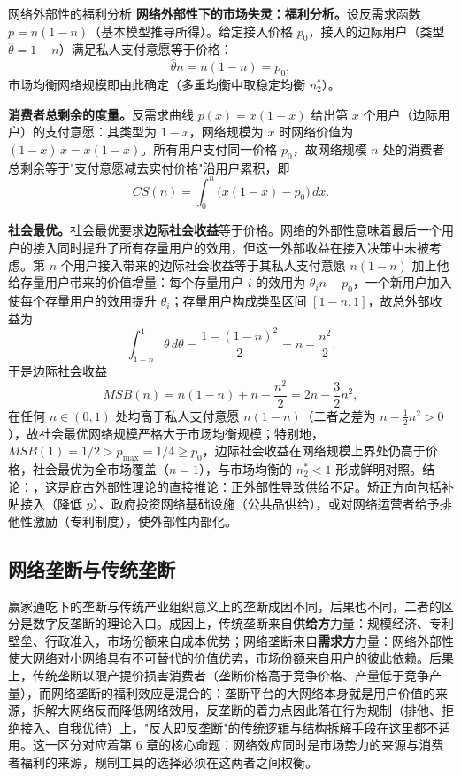 \begin{derivation}{网络外部性的福利分析}{}
\textbf{网络外部性下的市场失灵：福利分析。}设反需求函数 $p = n(1-n)$（基本模型推导所得）。给定接入价格 $p_0$，接入的边际用户（类型 $\hat\theta = 1-n$）满足私人支付意愿等于价格：
\[
\hat\theta n = n(1-n) = p_0,
\]
市场均衡网络规模即由此确定（多重均衡中取稳定均衡 $n_2^*$）。

\textbf{消费者总剩余的度量。}反需求曲线 $p(x) = x(1-x)$ 给出第 $x$ 个用户（边际用户）的支付意愿：其类型为 $1-x$，网络规模为 $x$ 时网络价值为 $(1-x)\,x = x(1-x)$。所有用户支付同一价格 $p_0$，故网络规模 $n$ 处的消费者总剩余等于"支付意愿减去实付价格"沿用户累积，即
\[
CS(n) = \int_0^n \bigl(x(1-x) - p_0\bigr) \, dx.
\]

\textbf{社会最优。}社会最优要求\textbf{边际社会收益}等于价格。网络的外部性意味着最后一个用户的接入同时提升了所有存量用户的效用，但这一外部收益在接入决策中未被考虑。第 $n$ 个用户接入带来的边际社会收益等于其私人支付意愿 $n(1-n)$ 加上他给存量用户带来的价值增量：每个存量用户 $i$ 的效用为 $\theta_i n - p_0$，一个新用户加入使每个存量用户的效用提升 $\theta_i$；存量用户构成类型区间 $[1-n, 1]$，故总外部收益为
\[
\int_{1-n}^{1} \theta \, d\theta = \frac{1 - (1-n)^2}{2} = n - \frac{n^2}{2}.
\]
于是边际社会收益
\[
MSB(n) = n(1-n) + n - \frac{n^2}{2} = 2n - \frac{3}{2} n^2,
\]
在任何 $n \in (0,1)$ 处均高于私人支付意愿 $n(1-n)$（二者之差为 $n - \tfrac12 n^2 > 0$），故社会最优网络规模严格大于市场均衡规模；特别地，$MSB(1) = 1/2 > p_{\max} = 1/4 \geq p_0$，边际社会收益在网络规模上界处仍高于价格，社会最优为全市场覆盖（$n = 1$），与市场均衡的 $n_2^* < 1$ 形成鲜明对照。结论：，这是庇古外部性理论的直接推论：正外部性导致供给不足。矫正方向包括补贴接入（降低 $p$）、政府投资网络基础设施（公共品供给），或对网络运营者给予排他性激励（专利制度），使外部性内部化。
\end{derivation}

\subsection{网络垄断与传统垄断}

赢家通吃下的垄断与传统产业组织意义上的垄断成因不同，后果也不同，二者的区分是数字反垄断的理论入口。成因上，传统垄断来自\textbf{供给方}力量：规模经济、专利壁垒、行政准入，市场份额来自成本优势；网络垄断来自\textbf{需求方}力量：网络外部性使大网络对小网络具有不可替代的价值优势，市场份额来自用户的彼此依赖。后果上，传统垄断以限产提价损害消费者（垄断价格高于竞争价格、产量低于竞争产量），而网络垄断的福利效应是混合的：垄断平台的大网络本身就是用户价值的来源，拆解大网络反而降低网络效用，反垄断的着力点因此落在行为规制（排他、拒绝接入、自我优待）上，"反大即反垄断"的传统逻辑与结构拆解手段在这里都不适用。这一区分对应着第 6 章的核心命题：网络效应同时是市场势力的来源与消费者福利的来源，规制工具的选择必须在这两者之间权衡。

